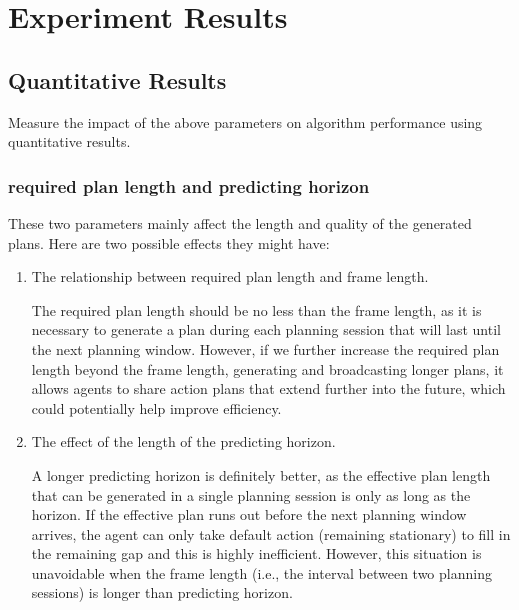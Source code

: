 \section{Experiment Results}
\subsection{Quantitative Results}

Measure the impact of the above parameters on algorithm performance using quantitative results.

\subsubsection{required plan length and predicting horizon}

These two parameters mainly affect the length and quality of the generated plans.
Here are two possible effects they might have:

\begin{enumerate}
    \item The relationship between required plan length and frame length.
    
    The required plan length should be no less than the frame length, as it is necessary to generate a plan during each planning session that will last until the next planning window.
    However, if we further increase the required plan length beyond the frame length, generating and broadcasting longer plans, it allows agents to share action plans that extend further into the future, which could potentially help improve efficiency.
    
    \item The effect of the length of the predicting horizon.
    
    A longer predicting horizon is definitely better, as the effective plan length that can be generated in a single planning session is only as long as the horizon. 
    If the effective plan runs out before the next planning window arrives, the agent can only take default action (remaining stationary) to fill in the remaining gap and this is highly inefficient.
    However, this situation is unavoidable when the frame length (i.e., the interval between two planning sessions) is longer than predicting horizon.
\end{enumerate}

